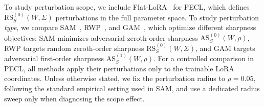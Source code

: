 \documentclass{article}
\theoremstyle{plain}
\theoremstyle{definition}
\theoremstyle{remark}
\begin{document}

To study perturbation {scope}, we include Flat-LoRA~\cite{li2025flatloralowrankadaptationflat} for PECL, which defines $\mathrm{RS}^{(0)}_S(W,\Sigma)$ perturbations in the full parameter space.
To study perturbation \emph{type}, we compare SAM~\cite{foretSharpnessAwareMinimizationEfficiently2021}, RWP~\cite{pmlr-v151-bisla22a}, and GAM~\cite{zhangGradientNormAware2023}, which optimize different sharpness objectives: SAM minimizes adversarial zeroth-order sharpness $\mathrm{AS}^{(0)}_S(W,\rho)$, RWP targets random zeroth-order sharpness $\mathrm{RS}^{(0)}_S(W,\Sigma)$, and GAM targets adversarial first-order sharpness $\mathrm{AS}^{(1)}_S(W,\rho)$. For a controlled comparison in PECL, all methods apply their perturbations only to the trainable LoRA coordinates.
Unless otherwise stated, we fix the perturbation radius to $\rho=0.05$, following the standard empirical setting used in SAM, and use a dedicated radius sweep only when diagnosing the scope effect.
\end{document}
